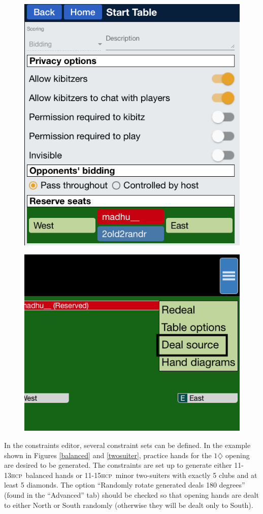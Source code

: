 \documentclass[a4paper,article,oneside]{memoir}
\newcommand{\hcp}{\textsc{hcp}}
\begin{document}
\begin{figure}[htbp]
  \centering
  \begin{minipage}{.6\textwidth}
    \centering
    \includegraphics[width=.6\linewidth]{start-table.png}
    \label{tablesetup}
  \end{minipage}%
  \begin{minipage}{.4\textwidth}
    \centering
    \includegraphics[width=.4\linewidth]{deal-setup.png}
    \label{dealmenu}
  \end{minipage}
\end{figure}

In the constraints editor, several constraint sets can be defined. In
the example shown in Figures \ref{balanced} and \ref{twosuiter},
practice hands for the $1\diamondsuit$ opening are desired to be
generated. The constraints are set up to generate either 11-13\hcp\
balanced hands or 11-15\hcp\ minor two-suiters with exactly 5 clubs
and at least 5 diamonds. The option ``Randomly rotate generated deals
180 degrees'' (found in the ``Advanced'' tab) should be checked so
that opening hands are dealt to either North or South randomly
(otherwise they will be dealt only to South).
\end{document}
